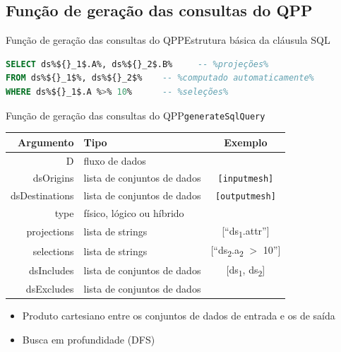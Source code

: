 \documentclass[12pt,compress,final]{beamer}
\begin{document}

\subsection*{Função de geração das consultas do QPP}

\begin{frame}[fragile]{Função de geração das consultas do QPP}{Estrutura básica da cláusula SQL}

\begin{lstlisting}[language=sql,deletendkeywords={TIME},basicstyle=\large]
SELECT ds%${}_1$.A%, ds%${}_2$.B%     -- %projeções%
FROM ds%${}_1$%, ds%${}_2$%    -- %computado automaticamente%
WHERE ds%${}_1$.A %>% 10%      -- %seleções%
\end{lstlisting}

\end{frame}


\begin{frame}[t]{Função de geração das consultas do QPP}{\texttt{generateSqlQuery}}

\vspace{-1cm}

\begin{table}
\centering
\begin{tabular}{r|l|c}
\toprule
\textbf{Argumento} & \textbf{Tipo} & \textbf{Exemplo}               \\
\midrule
D                  & fluxo de dados              \\
\alert{dsOrigins}          & lista de conjuntos de dados & \texttt{[inputmesh]} \\
\alert{dsDestinations}     & lista de conjuntos de dados & \texttt{[outputmesh]} \\
type               & físico, lógico ou híbrido   \\
projections        & lista de strings & [``ds\textsubscript{1}.attr'']             \\
selections         & lista de strings & [``ds\textsubscript{2}.a\textsubscript{2} $>$ 10'']            \\
dsIncludes         & lista de conjuntos de dados & [ds\textsubscript{1}, ds\textsubscript{2}] \\
dsExcludes         & lista de conjuntos de dados \\
\bottomrule
\end{tabular}
\end{table}

\vfill

\begin{itemize}
\item Produto cartesiano entre os conjuntos de dados de entrada e os de saída
\item Busca em profundidade (DFS)
\end{itemize}

\end{frame}
\end{document}
